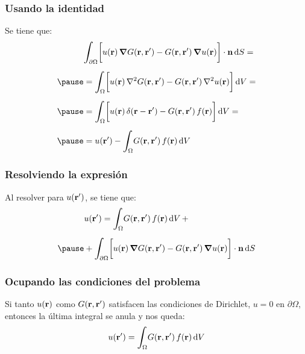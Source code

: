 \documentclass[12pt]{beamer}
\begin{document}
\begin{frame}
\frametitle{Usando la identidad}
Se tiene que:
\begin{eqnarray}
\begin{aligned}[b]
&\scaleint{6ex}_{\bs \partial \Omega} \bigg[ u (\vb{r}) \, \grad{G (\vb{r}, \vb{\pderivada{r}})} - G (\vb{r}, \vb{\pderivada{r}}) \, \grad{u (\vb{r})} \bigg] \cdot \vb{n} \dd{S} = \\[0.5em] \pause
&= \scaleint{6ex}_{\bs \Omega} \bigg[ u (\vb{r}) \, \laplacian{G (\vb{r}, \vb{\pderivada{r}})} - G (\vb{r}, \vb{\pderivada{r}}) \, \laplacian{u (\vb{r})} \bigg] \dd{V} = \\[0.5em] \pause
&= \scaleint{6ex}_{\bs \Omega} \bigg[ u (\vb{r}) \, \delta (\vb{r} - \vb{\pderivada{r}}) - G (\vb{r}, \vb{\pderivada{r}}) \, f (\vb{r}) \bigg] \dd{V} = \\[0.5em] \pause
&= u (\vb{\pderivada{r}}) - \scaleint{6ex}_{\bs \Omega} G (\vb{r}, \vb{\pderivada{r}}) \, f (\vb{r}) \dd{V}
\end{aligned}
\label{eq:ecuacion_07_02}
\end{eqnarray}
\end{frame}

\begin{frame}
\frametitle{Resolviendo la expresión}
Al resolver para $u (\vb{\ensuremath{{r}^{\prime}}})$, se tiene que:
\pause
\begin{eqnarray}
\begin{aligned}[b]
&u (\vb{\pderivada{r}}) = \scaleint{6ex}_{\bs \Omega} G (\vb{r}, \vb{\pderivada{r}}) \, f (\vb{r}) \dd{V} + \\[0.5em] \pause
&+ \scaleint{6ex}_{\bs \partial \Omega} \bigg[ u (\vb{r}) \, \grad{G (\vb{r}, \vb{\pderivada{r}})} - G (\vb{r}, \vb{\pderivada{r}}) \, \grad{u (\vb{r})} \bigg] \cdot \vb{n} \dd{S}
\end{aligned}
\label{eq:ecuacion_07_03}
\end{eqnarray}
\end{frame}

\begin{frame}
\frametitle{Ocupando las condiciones del problema}
Si tanto $u (\vb{r})$ como $G (\vb{r}, \vb{\ensuremath{{r}^{\prime}}})$ satisfacen las condiciones de Dirichlet, $u = 0$ en $\partial \Omega$, \pause entonces la última integral se anula y nos queda:
\begin{align*}
u (\vb{\pderivada{r}}) = \scaleint{6ex}_{\bs \Omega} G (\vb{r}, \vb{\pderivada{r}}) \, f (\vb{r}) \dd{V}
\end{align*}
\end{frame}
\end{document}
